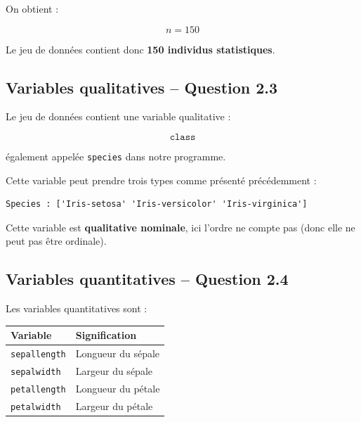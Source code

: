 \documentclass[12pt,a4paper]{article}
\begin{document}
On obtient :

\[
\boxed{n = 150}
\]

Le jeu de données contient donc \textbf{150 individus statistiques}.



\subsection{Variables qualitatives -- Question 2.3}

Le jeu de données contient une variable qualitative :

\[
\boxed{\texttt{class}}
\]

également appelée \texttt{species} dans notre programme.

Cette variable peut prendre trois types comme présenté précédemment :

\begin{lstlisting}
Species : ['Iris-setosa' 'Iris-versicolor' 'Iris-virginica']
\end{lstlisting}

Cette variable est \textbf{qualitative nominale}, ici l'ordre ne compte pas (donc elle ne peut pas être ordinale).


\subsection{Variables quantitatives -- Question 2.4}

Les variables quantitatives sont :

\begin{center}
\begin{tabular}{ll}
\toprule
\textbf{Variable} & \textbf{Signification} \\
\midrule
\texttt{sepallength} & Longueur du sépale \\
\texttt{sepalwidth} & Largeur du sépale \\
\texttt{petallength} & Longueur du pétale \\
\texttt{petalwidth} & Largeur du pétale \\
\bottomrule
\end{tabular}
\end{center}
\end{document}
